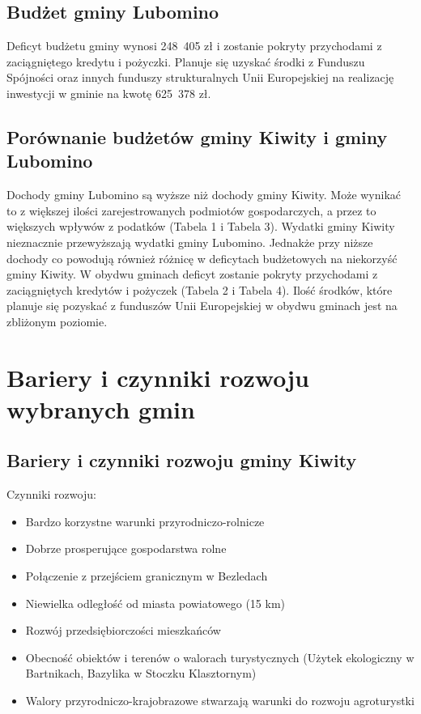 \documentclass[a4paper,10pt]{article}
\begin{document}
  \subsection{Budżet gminy Lubomino}
    Deficyt budżetu gminy wynosi 248 405 zł i zostanie pokryty przychodami z zaciągniętego kredytu i pożyczki.
    Planuje się uzyskać środki z Funduszu Spójności oraz innych funduszy strukturalnych Unii Europejskiej na realizację inwestycji w gminie na kwotę 625 378 zł.
  
  \subsection{Porównanie budżetów gminy Kiwity i gminy Lubomino}
    Dochody gminy Lubomino są wyższe niż dochody gminy Kiwity. 
    Może wynikać to z większej ilości zarejestrowanych podmiotów gospodarczych, a przez to większych wpływów z podatków (Tabela 1 i Tabela 3).
    Wydatki gminy Kiwity nieznacznie przewyższają wydatki gminy Lubomino. 
    Jednakże przy niższe dochody co powodują również różnicę w deficytach budżetowych na niekorzyść gminy Kiwity. 
    W obydwu gminach deficyt zostanie pokryty przychodami z zaciągniętych kredytów i pożyczek (Tabela 2 i Tabela 4).
    Ilość środków, które planuje się pozyskać z funduszów Unii Europejskiej w obydwu gminach jest na zbliżonym poziomie.
    
\newpage
\section{Bariery i czynniki rozwoju wybranych gmin}
  \subsection{Bariery i czynniki rozwoju gminy Kiwity}
    Czynniki rozwoju:
    
    \begin{itemize}
     \item Bardzo korzystne warunki przyrodniczo-rolnicze
     \item Dobrze prosperujące gospodarstwa rolne
     \item Połączenie z przejściem granicznym w Bezledach
     \item Niewielka odległość od miasta powiatowego (15 km)
     \item Rozwój przedsiębiorczości mieszkańców
     \item Obecność obiektów i terenów o walorach turystycznych (Użytek ekologiczny w Bartnikach, Bazylika w Stoczku Klasztornym)
     \item Walory przyrodniczo-krajobrazowe stwarzają warunki do rozwoju agroturystki
    \end{itemize}
    
\end{document}
